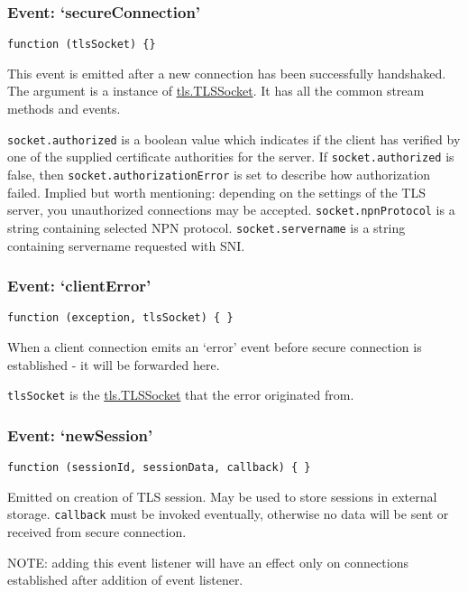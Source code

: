 \subsubsection{Event: `secureConnection'}\label{event-secureconnection}

\texttt{function (tlsSocket) \{\}}

This event is emitted after a new connection has been successfully
handshaked. The argument is a instance of
\hyperref[tlsux5fclassux5ftlsux5ftlssocket]{tls.TLSSocket}. It has all
the common stream methods and events.

\texttt{socket.authorized} is a boolean value which indicates if the
client has verified by one of the supplied certificate authorities for
the server. If \texttt{socket.authorized} is false, then
\texttt{socket.authorizationError} is set to describe how authorization
failed. Implied but worth mentioning: depending on the settings of the
TLS server, you unauthorized connections may be accepted.
\texttt{socket.npnProtocol} is a string containing selected NPN
protocol. \texttt{socket.servername} is a string containing servername
requested with SNI.

\subsubsection{Event: `clientError'}\label{event-clienterror}

\texttt{function (exception, tlsSocket) \{ \}}

When a client connection emits an `error' event before secure connection
is established - it will be forwarded here.

\texttt{tlsSocket} is the
\hyperref[tlsux5fclassux5ftlsux5ftlssocket]{tls.TLSSocket} that the
error originated from.

\subsubsection{Event: `newSession'}\label{event-newsession}

\texttt{function (sessionId, sessionData, callback) \{ \}}

Emitted on creation of TLS session. May be used to store sessions in
external storage. \texttt{callback} must be invoked eventually,
otherwise no data will be sent or received from secure connection.

NOTE: adding this event listener will have an effect only on connections
established after addition of event listener.

